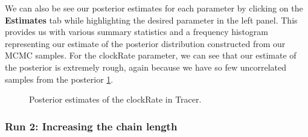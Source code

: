 \documentclass[11pt]{article}
\begin{document}
We can also be see our posterior estimates for each parameter by clicking on the \textbf{Estimates} tab while highlighting the desired parameter in the left panel. This provides us with various summary statistics and a frequency histogram representing our estimate of the posterior distribution constructed from our MCMC samples. For the clockRate parameter, we can see that our estimate of the posterior is extremely rough, again because we have so few uncorrelated samples from the posterior \ref{fig:tracer_run1_ests}.

\begin{figure}[!h]
\centering
{}
\caption{\small Posterior estimates of the clockRate in Tracer.}
\label{fig:tracer_run1_ests}
\end{figure}

\bigskip
\subsubsection{Run 2: Increasing the chain length}
\end{document}
